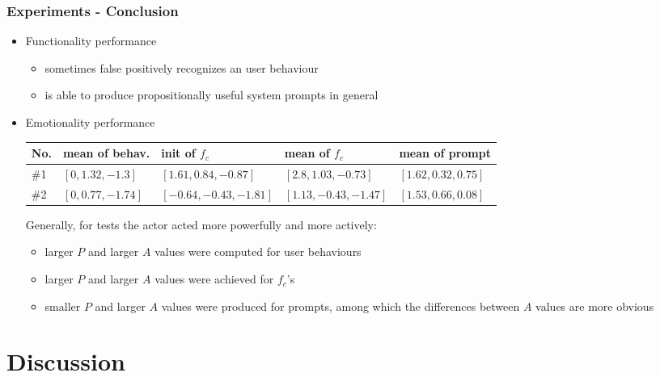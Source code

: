 \documentclass{beamer}
\begin{document}
\begin{frame}
\frametitle{Experiments - Conclusion}
\begin{itemize}
\item Functionality performance
\begin{itemize}
\item sometimes false positively recognizes an user behaviour
\item is able to produce propositionally useful system prompts in general
\end{itemize}
\item Emotionality performance
\begin{table}
\scriptsize
\centering
\begin{tabular}{|  p{0.3cm} | p{1.8cm} |  p{2.5cm} |  p{2.5cm} | p{2cm} |}
\hline
No. & mean of behav. & init of $f_c$ & mean of $f_c$ & mean of prompt \\ \hline
\#1 & $[0,1.32,-1.3]$ & $[1.61,0.84,-0.87]$ &  $[2.8,1.03,-0.73]$ & $[1.62,0.32,0.75]$ \\ \hline
\#2 & $[0,0.77,-1.74]$ & $[-0.64,-0.43,-1.81]$ & $[1.13,-0.43,-1.47]$ & $[1.53,0.66,0.08]$ \\ \hline
\end{tabular}
\end{table}
\vspace{.3cm}
Generally, for tests the actor acted more powerfully and more actively:
\begin{itemize}
\item larger $P$ and larger $A$ values were computed for user behaviours
\item larger $P$ and larger $A$ values were achieved for $f_c$'s
\item smaller $P$ and larger $A$ values were produced for prompts, among which the differences between $A$ values are more obvious
\end{itemize}
\end{itemize}
\end{frame}

\section{Discussion}
\end{document}
